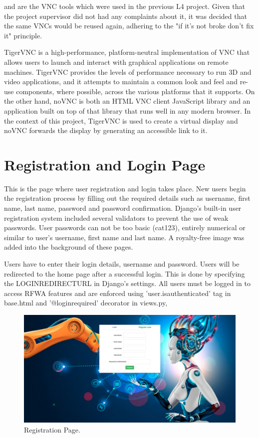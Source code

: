\documentclass{l4proj}
\begin{document}
\cite{TigerVNC} and \cite{noVNC} are the VNC tools which were used in the previous L4 project. Given that the project supervisor did not had any complaints about it, it was decided that the same VNCs would be reused again, adhering to the "if it’s not broke don’t fix it" principle.

TigerVNC is a high-performance, platform-neutral implementation of VNC that allows users to launch and interact with graphical applications on remote machines. TigerVNC provides the levels of performance necessary to run 3D and video applications, and it attempts to maintain a common look and feel and re-use components, where possible, across the various platforms that it supports. On the other hand, noVNC is both an HTML VNC client JavaScript library and an application built on top of that library that runs well in any modern browser. In the context of this project, TigerVNC is used to create a virtual display and noVNC forwards the display by generating an accessible link to it.

\section{Registration and Login Page}

This is the page where user registration and login takes place. New users begin the registration process by filling out the required details such as username, first name, last name, password and password confirmation. Django's built-in user registration system included several validators to prevent the use of weak passwords. User passwords can not be too basic (cat123), entirely numerical or similar to user's username, first name and last name. A royalty-free image was added into the background of these pages. 

Users have to enter their login details, username and password. Users will be redirected to the home page after a successful login. This is done by specifying the LOGIN\textunderscore REDIRECT\textunderscore URL in Django's settings. All users must be logged in to access RFWA features and are enforced using 'user.is\textunderscore authenticated' tag in base.html and '@login\textunderscore required' decorator in views.py,


\begin{figure}[h]
    \centering
    \includegraphics[scale=0.2]{images/registration_page.png}
    \caption{Registration Page.}
    \label{fig:registration_page}
\end{figure}
\end{document}
